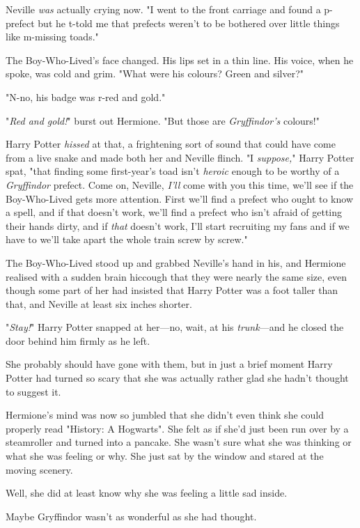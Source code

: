 Neville \emph{was} actually crying now. "I went to the front carriage and found 
a p-prefect but he t-told me that prefects weren't to be bothered over little 
things like m-missing toads."

The Boy-Who-Lived's face changed. His lips set in a thin line. His voice, when 
he spoke, was cold and grim. "What were his colours? Green and silver?"

"N-no, his badge was r-red and gold."

"\emph{Red and gold!}" burst out Hermione. "But those are \emph{Gryffindor's} 
colours!"

Harry Potter \emph{hissed} at that, a frightening sort of sound that could have 
come from a live snake and made both her and Neville flinch. "I 
\emph{suppose,}" Harry Potter spat, "that finding some first-year's toad isn't 
\emph{heroic} enough to be worthy of a \emph{Gryffindor} prefect. Come on, 
Neville, \emph{I'll} come with you this time, we'll see if the Boy-Who-Lived 
gets more attention. First we'll find a prefect who ought to know a spell, and 
if that doesn't work, we'll find a prefect who isn't afraid of getting their 
hands dirty, and if \emph{that} doesn't work, I'll start recruiting my fans and 
if we have to we'll take apart the whole train screw by screw."

The Boy-Who-Lived stood up and grabbed Neville's hand in his, and Hermione 
realised with a sudden brain hiccough that they were nearly the same size, even 
though some part of her had insisted that Harry Potter was a foot taller than 
that, and Neville at least six inches shorter.

"\emph{Stay!}" Harry Potter snapped at her---no, wait, at his 
\emph{trunk}---and he closed the door behind him firmly as he left.

She probably should have gone with them, but in just a brief moment Harry 
Potter had turned so scary that she was actually rather glad she hadn't thought 
to suggest it.

Hermione's mind was now so jumbled that she didn't even think she could 
properly read "History: A Hogwarts". She felt as if she'd just been run over by 
a steamroller and turned into a pancake. She wasn't sure what she was thinking 
or what she was feeling or why. She just sat by the window and stared at the 
moving scenery.

Well, she did at least know why she was feeling a little sad inside.

Maybe Gryffindor wasn't as wonderful as she had thought.
